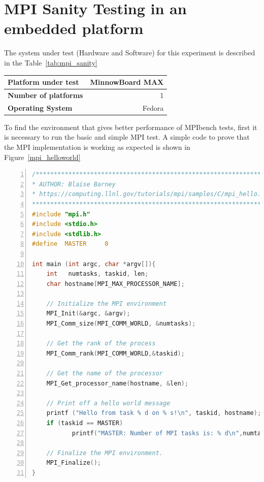 \section{MPI Sanity Testing in an embedded platform}

The system under test (Hardware and Software) for this experiment is described
in the Table~\ref{tab:mpi_sanity}

    \begin{center}
    \begin{tabular}{ | l | r |}
        \hline
        \textbf{Platform under test} &  MinnowBoard MAX \\ \hline
        \textbf{Number of platforms}  & 1  \\ \hline
        \textbf{Operating System} & Fedora  \\ \hline
    \end{tabular}
    \label{tab:mpi_sanity}
    \end{center}

To find the environment that gives better performance of  MPIbench tests, first
it is necessary to run the basic and simple MPI test. A simple code to prove
that the MPI implementation is working as expected is shown in
Figure~\ref{mpi_helloworld}


\begin{minipage}{\textwidth}
\end{minipage}

\begin{minipage}{\textwidth}
\begin{lstlisting}[frame=single,numbers=left,breaklines=true,language=C]
/*************************************************************************
* AUTHOR: Blaise Barney
* https://computing.llnl.gov/tutorials/mpi/samples/C/mpi_hello.c
**************************************************************************/
#include "mpi.h"
#include <stdio.h>
#include <stdlib.h>
#define  MASTER     0

int main (int argc, char *argv[]){
    int   numtasks, taskid, len;
    char hostname[MPI_MAX_PROCESSOR_NAME];

    // Initialize the MPI environment
    MPI_Init(&argc, &argv);
    MPI_Comm_size(MPI_COMM_WORLD, &numtasks);

    // Get the rank of the process
    MPI_Comm_rank(MPI_COMM_WORLD,&taskid);

    // Get the name of the processor
    MPI_Get_processor_name(hostname, &len);

    // Print off a hello world message
    printf ("Hello from task % d on % s!\n", taskid, hostname);
    if (taskid == MASTER)
           printf("MASTER: Number of MPI tasks is: % d\n",numtasks);
    
    // Finalize the MPI environment.
    MPI_Finalize();
}
\end{lstlisting}
\label{mpi_helloworld} 
\end{minipage}

